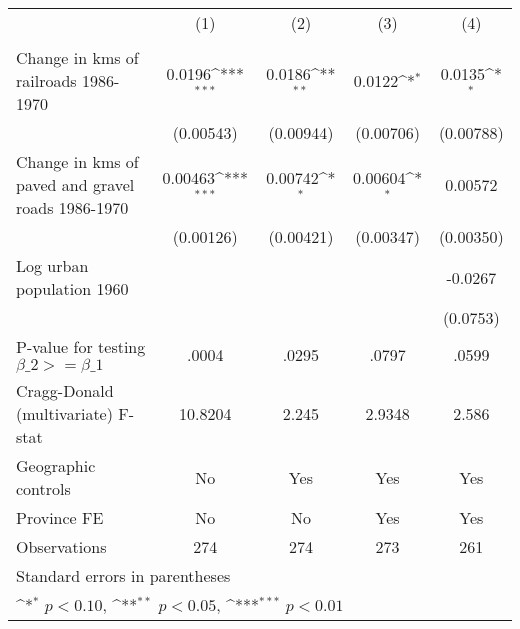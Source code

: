 {
\def\sym#1{\ifmmode^{#1}\else\(^{#1}\)\fi}
\begin{tabular}{l*{4}{c}}
\hline\hline
                &\multicolumn{1}{c}{(1)}&\multicolumn{1}{c}{(2)}&\multicolumn{1}{c}{(3)}&\multicolumn{1}{c}{(4)}\\
                &\multicolumn{1}{c}{}&\multicolumn{1}{c}{}&\multicolumn{1}{c}{}&\multicolumn{1}{c}{}\\
\hline
Change in kms of railroads 1986-1970&   0.0196\sym{***}&   0.0186\sym{**} &   0.0122\sym{*}  &   0.0135\sym{*}  \\
                &(0.00543)         &(0.00944)         &(0.00706)         &(0.00788)         \\
[1em]
Change in kms of paved and gravel roads 1986-1970&  0.00463\sym{***}&  0.00742\sym{*}  &  0.00604\sym{*}  &  0.00572         \\
                &(0.00126)         &(0.00421)         &(0.00347)         &(0.00350)         \\
[1em]
Log urban population 1960&                  &                  &                  &  -0.0267         \\
                &                  &                  &                  & (0.0753)         \\
\hline
P-value for testing $\beta\_{2} >= \beta\_{1}$&    .0004         &    .0295         &    .0797         &    .0599         \\
Cragg-Donald (multivariate) F-stat&  10.8204         &    2.245         &   2.9348         &    2.586         \\
Geographic controls&       No         &      Yes         &      Yes         &      Yes         \\
Province FE     &       No         &       No         &      Yes         &      Yes         \\
Observations    &      274         &      274         &      273         &      261         \\
\hline\hline
\multicolumn{5}{l}{\footnotesize Standard errors in parentheses}\\
\multicolumn{5}{l}{\footnotesize \sym{*} \(p<0.10\), \sym{**} \(p<0.05\), \sym{***} \(p<0.01\)}\\
\end{tabular}
}
